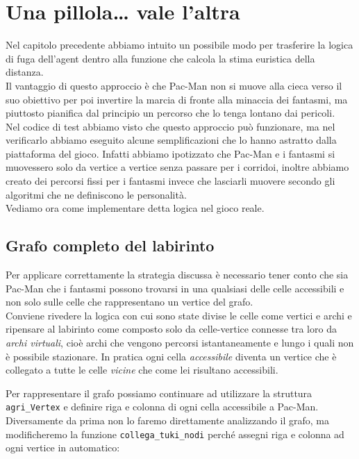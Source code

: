 \documentclass[8pt]{book}
\begin{document}
\chapter{Una pillola\ldots{} vale l'altra}

Nel capitolo precedente abbiamo intuito un possibile modo per trasferire la logica di fuga dell'agent dentro alla funzione che calcola la stima euristica della distanza.\\
Il vantaggio di questo approccio è che Pac-Man non si muove alla cieca verso il suo obiettivo per poi invertire la marcia di fronte alla minaccia dei fantasmi, ma piuttosto pianifica dal principio un percorso che lo tenga lontano dai pericoli.\\

Nel codice di test abbiamo visto che questo approccio può funzionare, ma nel verificarlo abbiamo eseguito alcune semplificazioni che lo hanno astratto dalla piattaforma del gioco. Infatti abbiamo ipotizzato che Pac-Man e i fantasmi si muovessero solo da vertice a vertice senza passare per i corridoi, inoltre abbiamo creato dei percorsi fissi per i fantasmi invece che lasciarli muovere secondo gli algoritmi che ne definiscono le personalità.\\
Vediamo ora come implementare detta logica nel gioco reale.

\section{Grafo completo del labirinto}

Per applicare correttamente la strategia discussa è necessario tener conto che sia Pac-Man che i fantasmi possono trovarsi in una qualsiasi delle celle accessibili e non solo sulle celle che rappresentano un vertice del grafo.\\
Conviene rivedere la logica con cui sono state divise le celle come vertici e archi e ripensare al labirinto come composto solo da celle-vertice connesse tra loro da \emph{archi virtuali}, cioè archi che vengono percorsi istantaneamente e lungo i quali non è possibile stazionare. In pratica ogni cella \emph{accessibile} diventa un vertice che è collegato a tutte le celle \emph{vicine} che come lei risultano accessibili.

Per rappresentare il grafo possiamo continuare ad utilizzare la struttura \texttt{agri\_Vertex} e definire riga e colonna di ogni cella accessibile a Pac-Man. Diversamente da prima non lo faremo direttamente analizzando il grafo, ma modificheremo la funzione \texttt{collega\_tuki\_nodi} perché assegni riga e colonna ad ogni vertice in automatico:
\end{document}
